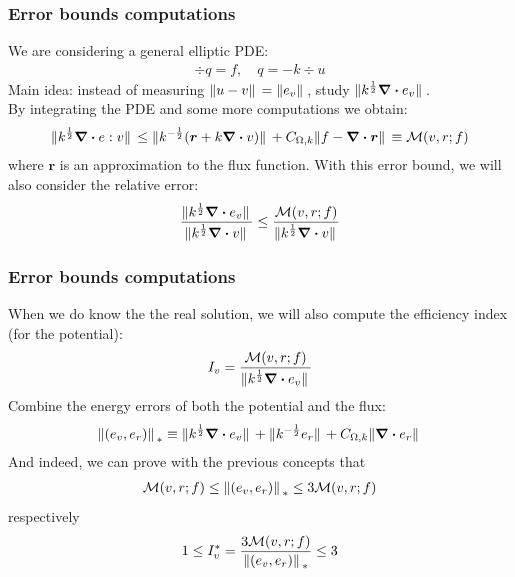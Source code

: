 \documentclass[t]{beamer}
\begin{document}
\begin{frame}
\frametitle{Error bounds computations}
We are considering a general elliptic PDE:
\begin{align*}
\div q = f , \quad q =-k \div u
\end{align*}
Main idea: instead of measuring $\norm*{u-v} = \norm*{e_v}$, study $\norm*{k^{\frac{1}{2}}\div e_v}$. 
\\ By integrating the PDE and some more computations we obtain:
\begin{align*}
\norm*{k^{\frac{1}{2}}\div e:v} \leq \norm*{k^{-\frac{1}{2}}(\bm{r}+k\div v)} + C_{\Omega,k}\norm*{f-\div \bm{r}} \equiv \mathcal{M}(v,r;f)
\end{align*}
where $\bm{r}$ is an approximation to the flux function.
With this error bound, we will also consider the \alert{relative error}:
\begin{align*}
\frac{\norm*{k^{\frac{1}{2}}\div e_v}}{\norm*{k^{\frac{1}{2}}\div v}} \leq \frac{\mathcal{M}(v,r;f)}{\norm*{k^{\frac{1}{2}}\div v}}
\end{align*}

\end{frame}

\begin{frame}
\frametitle{Error bounds computations}
When we do know the the real solution, we will also compute the \alert{efficiency index} (for the potential):
\begin{align*}
I_v = \frac{\mathcal{M}(v,r;f)}{\norm*{k^{\frac{1}{2}}\div e_v}}
\end{align*}
Combine the energy errors of both the potential and the flux:
\begin{align*}
\norm*{(e_v,e_r)}_{*} \equiv \norm*{k^{\frac{1}{2}}\div e_v} + \norm*{k^{-\frac{1}{2}}e_r} + C_{\Omega,k}\norm*{\div e_r}
\end{align*} 
And indeed, we can prove with the previous concepts that 
\begin{align*}
\mathcal{M}(v,r;f) \leq  \norm*{(e_v,e_r)}_{*}  \leq 3\mathcal{M}(v,r;f)
\end{align*}
respectively
\begin{align*}
1 \leq I_v^\ast = \frac{3\mathcal{M}(v,r;f) }{\norm*{(e_v,e_r)}_{*}} \leq 3
\end{align*}
\end{frame}
\end{document}
